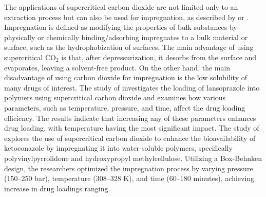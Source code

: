 \documentclass[a4paper,fleqn]{cas-dc}
\begin{document}
	The applications of supercritical carbon dioxide are not limited only to an extraction process but can also be used for impregnation, as described by \citet{Weidner2018} or \citet{Machado2022}. Impregnation is defined as modifying the properties of bulk substances by physically or chemically binding/adsorbing impregnates to a bulk material or surface, such as the hydrophobization of surfaces. The main advantage of using supercritical CO$_2$ is that, after depressurization, it desorbs from the surface and evaporates, leaving a solvent-free product. On the other hand, the main disadvantage of using carbon dioxide for impregnation is the low solubility of many drugs of interest.
	{\color{blue}The study of \citet{Ameri2020} investigates the loading of lansoprazole into polymers using supercritical carbon dioxide and examines how various parameters, such as temperature, pressure, and time, affect the drug loading efficiency. The results indicate that increasing any of these parameters enhances drug loading, with temperature having the most significant impact.	The study of \citet{Fathi2022} explores the use of supercritical carbon dioxide to enhance the bioavailability of ketoconazole by impregnating it into water-soluble polymers, specifically polyvinylpyrrolidone and hydroxypropyl methylcellulose. Utilizing a Box-Behnken design, the researchers optimized the impregnation process by varying pressure (150–250 bar), temperature (308–328 K), and time (60–180 minutes), achieving increase in drug loadings ranging.}
	
\end{document}
